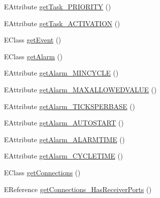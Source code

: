 \begin{DoxyCompactItemize}
\item 
E\-Attribute \hyperlink{classshootingmachineemfmodel_1_1impl_1_1_shootingmachineemfmodel_package_impl_aaf90279a00d93514e8cf819b89f6c00c}{get\-Task\-\_\-\-P\-R\-I\-O\-R\-I\-T\-Y} ()
\item 
E\-Attribute \hyperlink{classshootingmachineemfmodel_1_1impl_1_1_shootingmachineemfmodel_package_impl_a7334e1d16b72a399d322fc9e532a0c4c}{get\-Task\-\_\-\-A\-C\-T\-I\-V\-A\-T\-I\-O\-N} ()
\item 
E\-Class \hyperlink{classshootingmachineemfmodel_1_1impl_1_1_shootingmachineemfmodel_package_impl_ab8a65c25b50ad542b99ae48c8e84e808}{get\-Event} ()
\item 
E\-Class \hyperlink{classshootingmachineemfmodel_1_1impl_1_1_shootingmachineemfmodel_package_impl_aae7572a42a9d2658df63f0aea15ccf62}{get\-Alarm} ()
\item 
E\-Attribute \hyperlink{classshootingmachineemfmodel_1_1impl_1_1_shootingmachineemfmodel_package_impl_a6fcf4557f3a7bbade4f09afd712e779f}{get\-Alarm\-\_\-\-M\-I\-N\-C\-Y\-C\-L\-E} ()
\item 
E\-Attribute \hyperlink{classshootingmachineemfmodel_1_1impl_1_1_shootingmachineemfmodel_package_impl_af52bb3dd83b5d12f47bca6fd21c36259}{get\-Alarm\-\_\-\-M\-A\-X\-A\-L\-L\-O\-W\-E\-D\-V\-A\-L\-U\-E} ()
\item 
E\-Attribute \hyperlink{classshootingmachineemfmodel_1_1impl_1_1_shootingmachineemfmodel_package_impl_a4d5770a312feb087f78df8bdd6a0af33}{get\-Alarm\-\_\-\-T\-I\-C\-K\-S\-P\-E\-R\-B\-A\-S\-E} ()
\item 
E\-Attribute \hyperlink{classshootingmachineemfmodel_1_1impl_1_1_shootingmachineemfmodel_package_impl_a511d9b7e7efe9d7bbc589a8eef1ac6b0}{get\-Alarm\-\_\-\-A\-U\-T\-O\-S\-T\-A\-R\-T} ()
\item 
E\-Attribute \hyperlink{classshootingmachineemfmodel_1_1impl_1_1_shootingmachineemfmodel_package_impl_a63aa784760a93bc30f7f1b551abc54f6}{get\-Alarm\-\_\-\-A\-L\-A\-R\-M\-T\-I\-M\-E} ()
\item 
E\-Attribute \hyperlink{classshootingmachineemfmodel_1_1impl_1_1_shootingmachineemfmodel_package_impl_aa5fdd358ec3c0796dea73cfb2283f896}{get\-Alarm\-\_\-\-C\-Y\-C\-L\-E\-T\-I\-M\-E} ()
\item 
E\-Class \hyperlink{classshootingmachineemfmodel_1_1impl_1_1_shootingmachineemfmodel_package_impl_a60e10b61ac1758c8993ad4ef5b5a192a}{get\-Connections} ()
\item 
E\-Reference \hyperlink{classshootingmachineemfmodel_1_1impl_1_1_shootingmachineemfmodel_package_impl_a78fc6dc05a87f9ca7fb11283ce72e317}{get\-Connections\-\_\-\-Has\-Receiver\-Ports} ()

\end{DoxyCompactItemize}
